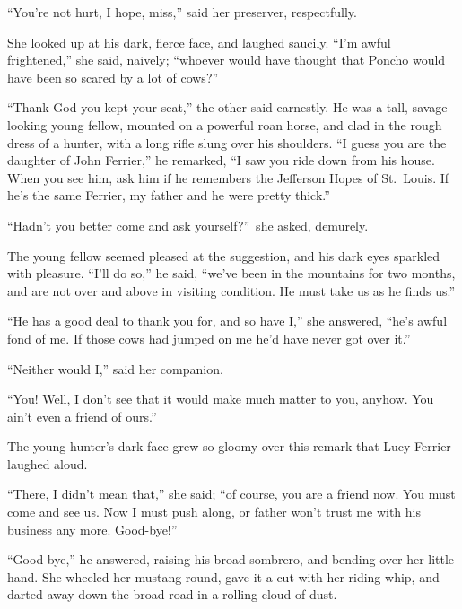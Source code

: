 \documentclass[12pt,english]{book}
\begin{document}
{}``You're not hurt, I hope, miss,'' said her preserver, respectfully.

She looked up at his dark, fierce face, and laughed saucily. {}``I'm
awful frightened,'' she said, naively; {}``whoever would have thought
that Poncho would have been so scared by a lot of cows?''

{}``Thank God you kept your seat,'' the other said earnestly. He
was a tall, savage-looking young fellow, mounted on a powerful roan
horse, and clad in the rough dress of a hunter, with a long rifle
slung over his shoulders. {}``I guess you are the daughter of John
Ferrier,'' he remarked, {}``I saw you ride down from his house.
When you see him, ask him if he remembers the Jefferson Hopes of St.\ Louis.
If he's the same Ferrier, my father and he were pretty thick.''

{}``Hadn't you better come and ask yourself?''\ she asked, demurely.

The young fellow seemed pleased at the suggestion, and his dark eyes
sparkled with pleasure. {}``I'll do so,'' he said, {}``we've been
in the mountains for two months, and are not over and above in visiting
condition. He must take us as he finds us.''

{}``He has a good deal to thank you for, and so have I,'' she answered,
{}``he's awful fond of me. If those cows had jumped on me he'd have
never got over it.''

{}``Neither would I,'' said her companion.

{}``You! Well, I don't see that it would make much matter to you,
anyhow. You ain't even a friend of ours.''

The young hunter's dark face grew so gloomy over this remark that
Lucy Ferrier laughed aloud.

{}``There, I didn't mean that,'' she said; {}``of course, you are
a friend now. You must come and see us. Now I must push along, or
father won't trust me with his business any more. Good-bye!''

{}``Good-bye,'' he answered, raising his broad sombrero, and bending
over her little hand. She wheeled her mustang round, gave it a cut
with her riding-whip, and darted away down the broad road in a rolling
cloud of dust.
\end{document}
